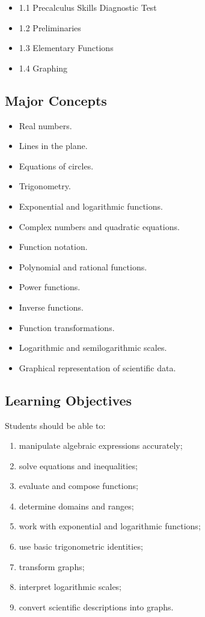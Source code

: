 \documentclass[11pt]{article}
\begin{document}
\begin{itemize}
    \item 1.1 Precalculus Skills Diagnostic Test
    \item 1.2 Preliminaries
    \item 1.3 Elementary Functions
    \item 1.4 Graphing
\end{itemize}

\subsection{Major Concepts}

\begin{itemize}
    \item Real numbers.
    \item Lines in the plane.
    \item Equations of circles.
    \item Trigonometry.
    \item Exponential and logarithmic functions.
    \item Complex numbers and quadratic equations.
    \item Function notation.
    \item Polynomial and rational functions.
    \item Power functions.
    \item Inverse functions.
    \item Function transformations.
    \item Logarithmic and semilogarithmic scales.
    \item Graphical representation of scientific data.
\end{itemize}

\subsection{Learning Objectives}

Students should be able to:

\begin{enumerate}
    \item manipulate algebraic expressions accurately;
    \item solve equations and inequalities;
    \item evaluate and compose functions;
    \item determine domains and ranges;
    \item work with exponential and logarithmic functions;
    \item use basic trigonometric identities;
    \item transform graphs;
    \item interpret logarithmic scales;
    \item convert scientific descriptions into graphs.
\end{enumerate}
\end{document}
